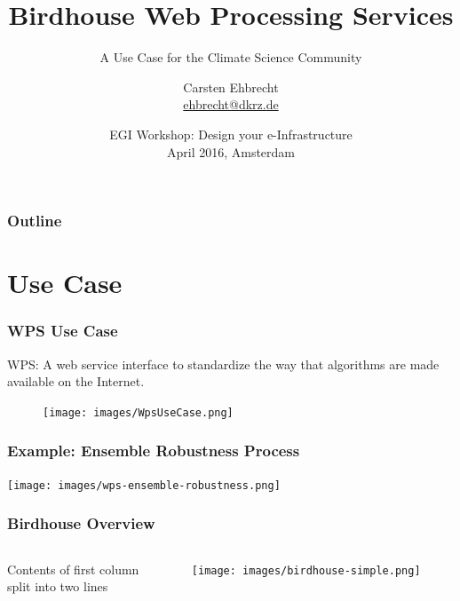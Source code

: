 \documentclass{beamer}
\title[Birdhouse]
{Birdhouse Web Processing Services}
\subtitle{A Use Case for the Climate Science Community}
\author{
Carsten Ehbrecht\\
\medskip
{\scriptsize \url{ehbrecht@dkrz.de}}
}
\institute{German Climate Computing Center (DKRZ)}
\date[April 2016]
{EGI Workshop: Design your e-Infrastructure\\
April 2016, Amsterdam}
\begin{document}

  \begin{frame}[plain]
    \titlepage
  \end{frame}


  {
    \begin{frame} %
      \frametitle{Outline}
      \tableofcontents[subsectionstyle=hide/hide]
    \end{frame}
  }


  \section{Use Case}



  \begin{frame}[plain]
    \frametitle{WPS Use Case}
    WPS: A web service interface to standardize the way that algorithms are made available on the Internet.
    \begin{figure}
      \texttt{[image: images/WpsUseCase.png]}
    \end{figure}
  \end{frame}


  \begin{frame}[plain]
    \frametitle{Example: Ensemble Robustness Process}
    \texttt{[image: images/wps-ensemble-robustness.png]}
   \end{frame}


  \begin{frame}
    \frametitle{Birdhouse Overview}
    \begin{columns}[T] %
     \begin{column}[T]{5cm} %
     Contents of first column \\ split into two lines
     \end{column}
     \begin{column}[T]{5cm} %
        \texttt{[image: images/birdhouse-simple.png]}
     \end{column}
   \end{columns}
  \end{frame}
\end{document}

